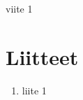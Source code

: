 \documentclass[a4paper,12pt]{article}
\begin{document}
\begin{thebibliography}{99}
\item{viite 1}
\label{viite1}

\end{thebibliography}


\section*{Liitteet}
\begin{enumerate}
\item{liite 1} \label{liite1}

\end{enumerate}
\end{document}
